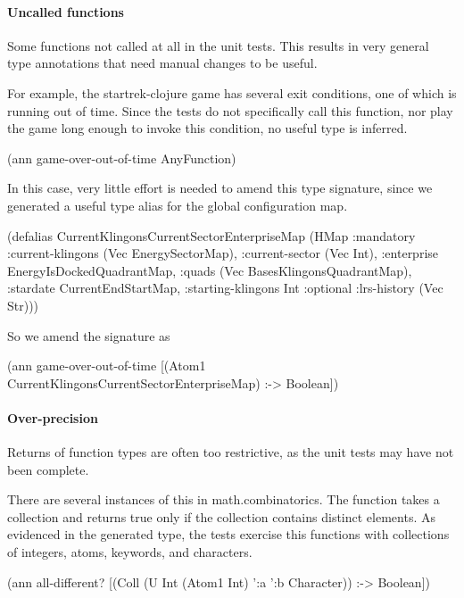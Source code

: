 \paragraph{Uncalled functions}
Some functions not called at all in the unit tests.
This results in very general type annotations that need
manual changes to be useful.

For example, the startrek-clojure game has several exit
conditions, one of which is running out of time.
Since the tests do not specifically call this function,
nor play the game long enough to invoke this condition,
no useful type is inferred.

\begin{cljlisting}
(ann game-over-out-of-time AnyFunction)
\end{cljlisting}

In this case, very little effort is needed to amend this
type signature, since we generated a useful type alias
for the global configuration map.

\begin{cljlisting}
(defalias CurrentKlingonsCurrentSectorEnterpriseMap
  (HMap :mandatory
    {:current-klingons (Vec EnergySectorMap), :current-sector (Vec Int), 
     :enterprise EnergyIsDockedQuadrantMap, :quads (Vec BasesKlingonsQuadrantMap), 
     :stardate CurrentEndStartMap, :starting-klingons Int}
    :optional 
		{:lrs-history (Vec Str)}))
\end{cljlisting}

So we amend the signature as

\begin{cljlisting}
(ann game-over-out-of-time [(Atom1 CurrentKlingonsCurrentSectorEnterpriseMap) :-> Boolean])
\end{cljlisting}


\paragraph{Over-precision}
Returns of function types are often too restrictive, as the unit
tests may have not been complete.

There are several instances of this in math.combinatorics.
The  function
takes a collection and returns true only if the collection
contains distinct elements.
As evidenced in the generated type, the tests exercise
this functions with collections of integers, atoms,
keywords, and characters.

\begin{cljlisting}
(ann all-different? [(Coll (U Int (Atom1 Int) ':a ':b Character)) :-> Boolean])
\end{cljlisting}

